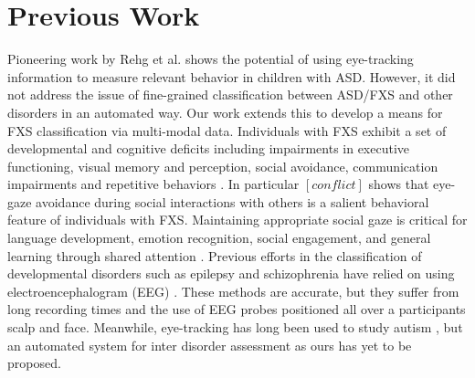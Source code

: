 \documentclass{llncs}
\begin{document}
\section {Previous Work}
\vspace{-1em} 
Pioneering work by Rehg et al. \cite{RAG33} shows the potential of using eye-tracking information to measure relevant behavior in children with ASD. 
However, it did not address the issue of fine-grained classification between ASD/FXS and other disorders in an automated way. Our work extends this to develop a means for FXS classification via multi-modal data.%
Individuals with FXS exhibit a set of developmental and cognitive deficits including impairments in executive functioning, visual memory and perception, social avoidance, communication impairments and repetitive behaviors \cite{Sullivan:2007gz}. In particular $[conflict]$ shows that eye-gaze avoidance during social interactions with others is a salient behavioral feature of individuals with FXS. Maintaining appropriate social gaze is critical for language development, emotion recognition, social engagement, and general learning through shared attention \cite{Csibra:2006wf}. 
Previous efforts in the classification of developmental disorders such as epilepsy and schizophrenia have relied on using electroencephalogram (EEG) \cite{Kumar}. These methods are accurate, but they suffer from long recording times and the use of EEG probes positioned all over a participants scalp and face. Meanwhile, eye-tracking has long been used to study autism \cite{Boraston,hashemi}, but an automated system for inter disorder assessment as ours has yet to be proposed.
\end{document}
